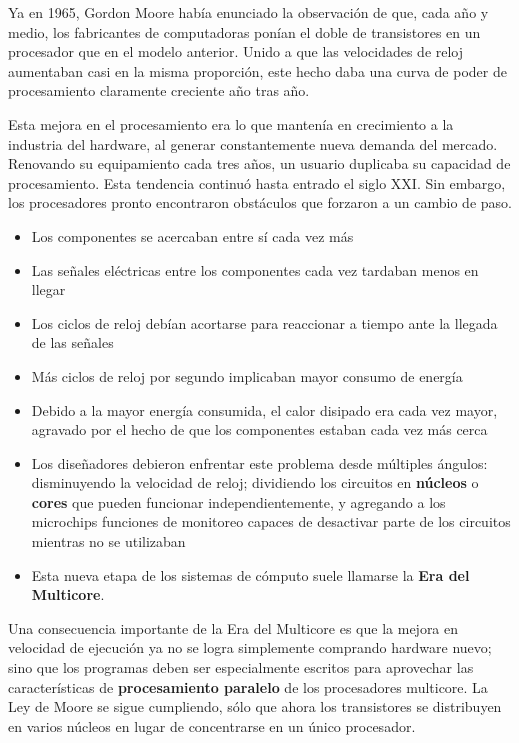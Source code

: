 \documentclass[spanish,A4,]{article}
\begin{document}
Ya en 1965, Gordon Moore había enunciado la observación de que, cada año
y medio, los fabricantes de computadoras ponían el doble de transistores
en un procesador que en el modelo anterior. Unido a que las velocidades
de reloj aumentaban casi en la misma proporción, este hecho daba una
curva de poder de procesamiento claramente creciente año tras año.

Esta mejora en el procesamiento era lo que mantenía en crecimiento a la
industria del hardware, al generar constantemente nueva demanda del
mercado. Renovando su equipamiento cada tres años, un usuario duplicaba
su capacidad de procesamiento. Esta tendencia continuó hasta entrado el
siglo XXI. Sin embargo, los procesadores pronto encontraron obstáculos
que forzaron a un cambio de paso.

\begin{itemize}
\itemsep1pt\parskip0pt
\item
  Los componentes se acercaban entre sí cada vez más
\item
  Las señales eléctricas entre los componentes cada vez tardaban menos
  en llegar
\item
  Los ciclos de reloj debían acortarse para reaccionar a tiempo ante la
  llegada de las señales
\item
  Más ciclos de reloj por segundo implicaban mayor consumo de energía
\item
  Debido a la mayor energía consumida, el calor disipado era cada vez
  mayor, agravado por el hecho de que los componentes estaban cada vez
  más cerca
\item
  Los diseñadores debieron enfrentar este problema desde múltiples
  ángulos: disminuyendo la velocidad de reloj; dividiendo los circuitos
  en \textbf{núcleos} o \textbf{cores} que pueden funcionar
  independientemente, y agregando a los microchips funciones de
  monitoreo capaces de desactivar parte de los circuitos mientras no se
  utilizaban
\item
  Esta nueva etapa de los sistemas de cómputo suele llamarse la
  \textbf{Era del Multicore}.
\end{itemize}

Una consecuencia importante de la Era del Multicore es que la mejora en
velocidad de ejecución ya no se logra simplemente comprando hardware
nuevo; sino que los programas deben ser especialmente escritos para
aprovechar las características de \textbf{procesamiento paralelo} de los
procesadores multicore. La Ley de Moore se sigue cumpliendo, sólo que
ahora los transistores se distribuyen en varios núcleos en lugar de
concentrarse en un único procesador.
\end{document}
